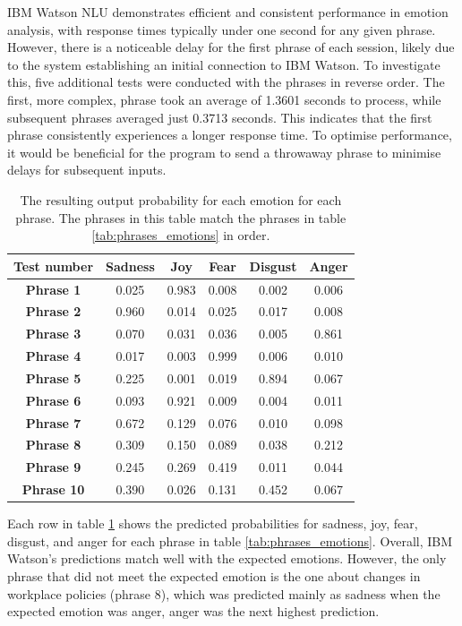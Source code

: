 IBM Watson NLU demonstrates efficient and consistent performance in emotion analysis, with response times typically under one second for any given phrase. However, there is a noticeable delay for the first phrase of each session, likely due to the system establishing an initial connection to IBM Watson. To investigate this, five additional tests were conducted with the phrases in reverse order. The first, more complex, phrase took an average of 1.3601 seconds to process, while subsequent phrases averaged just 0.3713 seconds. This indicates that the first phrase consistently experiences a longer response time. To optimise performance, it would be beneficial for the program to send a throwaway phrase to minimise delays for subsequent inputs.

\begin{table}[h!]
\centering{}
\caption{The resulting output probability for each emotion for each phrase. The phrases in this table match the phrases in table \ref{tab:phrases_emotions} in order.}
\begin{tabular}{|c|c|c|c|c|c|}
\hline
\textbf{Test number} & \textbf{Sadness} & \textbf{Joy} & \textbf{Fear} & \textbf{Disgust} & \textbf{Anger} \\ \hline
\textbf{Phrase 1} & 0.025 & 0.983 & 0.008 & 0.002 & 0.006 \\ \hline
\textbf{Phrase 2} & 0.960 & 0.014 & 0.025 & 0.017 & 0.008 \\ \hline
\textbf{Phrase 3} & 0.070 & 0.031 & 0.036 & 0.005 & 0.861 \\ \hline
\textbf{Phrase 4} & 0.017 & 0.003 & 0.999 & 0.006 & 0.010 \\ \hline
\textbf{Phrase 5} & 0.225 & 0.001 & 0.019 & 0.894 & 0.067 \\ \hline
\textbf{Phrase 6} & 0.093 & 0.921 & 0.009 & 0.004 & 0.011 \\ \hline
\textbf{Phrase 7} & 0.672 & 0.129 & 0.076 & 0.010 & 0.098 \\ \hline
\textbf{Phrase 8} & 0.309 & 0.150 & 0.089 & 0.038 & 0.212 \\ \hline
\textbf{Phrase 9} & 0.245 & 0.269 & 0.419 & 0.011 & 0.044 \\ \hline
\textbf{Phrase 10}& 0.390 & 0.026 & 0.131 & 0.452 & 0.067 \\ \hline
\end{tabular}
\label{tab:test_results}
\end{table}

Each row in table \ref{tab:test_results} shows the predicted probabilities for sadness, joy, fear, disgust, and anger for each phrase in table \ref{tab:phrases_emotions}. Overall, IBM Watson's predictions match well with the expected emotions. However, the only phrase that did not meet the expected emotion is the one about changes in workplace policies (phrase 8), which was predicted mainly as sadness when the expected emotion was anger, anger was the next highest prediction.

